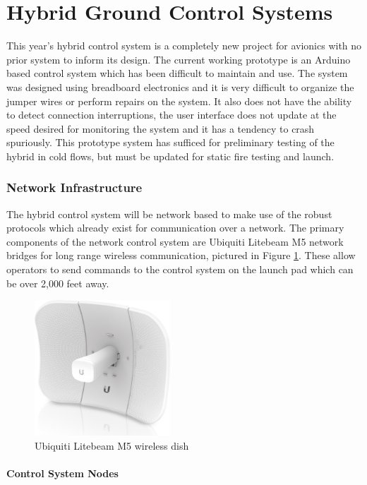 \part{Hybrid Ground Control Systems}

This year's hybrid control system is a completely new project for avionics with no prior system to inform its design.
The current working prototype is an Arduino based control system which has been difficult to maintain and use. The
system was designed using breadboard electronics and it is very difficult to organize the jumper wires or perform
repairs on the system. It also does not have the ability to detect connection interruptions, the user interface does
not update at the speed desired for monitoring the system and it has a tendency to crash spuriously. This prototype
system has sufficed for preliminary testing of the hybrid in cold flows, but must be updated for static fire testing
and launch.

\section{Network Infrastructure}

The hybrid control system will be network based to make use of the robust protocols which already exist for
communication over a network. The primary components of the network control system are Ubiquiti Litebeam M5 network bridges for
long range wireless communication, pictured in Figure \ref{fig:ubiquiti-dish}. These allow operators to send commands to the
control system on the launch pad which can be over 2,000 feet away.


\begin{figure}[H]
    \center
    \includegraphics[width=2in]{assets/images/ubiquiti-dish.jpg}
    \caption{Ubiquiti Litebeam M5 wireless dish \cite{ubiquiti-dish}}
    \label{fig:ubiquiti-dish}
\end{figure}

\subsection{Control System Nodes}

